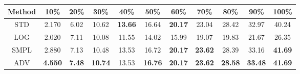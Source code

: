 \documentclass{standalone}
\begin{document}
\begin{tabular}{c|cccccccccc}
      \toprule
      Method & 10\% & 20\% & 30\% & 40\% & 50\% & 60\% & 70\% & 80\% & 90\% & 100\% \\
      \midrule
STD & 2.170 & 6.02 & 10.62 & \textbf{13.66} & 16.64 & \textbf{20.17} & 23.04 & 28.42 & 32.97 & 40.24\\
LOG & 2.020 & 7.11 & 10.08 & 11.55 & 14.02 & 15.99 & 19.07 & 19.83 & 21.67 & 26.35\\
SMPL & 2.880 & 7.13 & 10.48 & 13.53 & 16.72 & \textbf{20.17} & \textbf{23.62} & 28.39 & 33.16 & \textbf{41.69}\\
ADV & \textbf{4.550} & \textbf{7.48} & \textbf{10.74} & 13.53 & \textbf{16.76} & \textbf{20.17} & \textbf{23.62} & \textbf{28.58} & \textbf{33.48} & \textbf{41.69}\\
  \bottomrule
\end{tabular}
\end{document}
